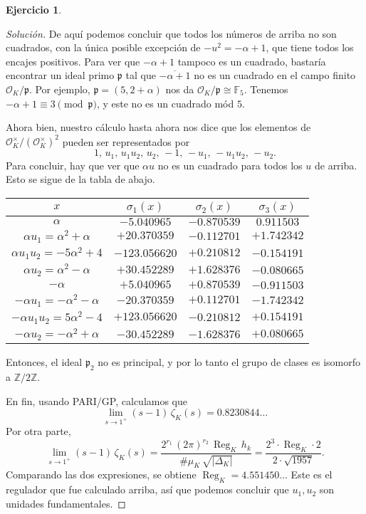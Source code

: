 \documentclass{article}
\theoremstyle{definition}
\newtheorem{ejercicio}{Ejercicio}
\newenvironment{solucion}{\begin{proof}[Solución]}{\end{proof}}
\DeclareMathOperator{\Reg}{Reg}
\newcommand{\FF}{\mathbb{F}}
\newcommand{\ZZ}{\mathbb{Z}}
\renewcommand{\O}{\mathcal{O}}
\begin{document}
\begin{ejercicio}
\begin{solucion}
    De aquí podemos concluir que todos los números de arriba no son cuadrados,
    con la única posible excepción de $-u^2 = -\alpha + 1$, que tiene todos los
    encajes positivos. Para ver que $-\alpha + 1$ tampoco es un cuadrado,
    bastaría encontrar un ideal primo $\mathfrak{p}$ tal que
    $\overline{-\alpha + 1}$ no es un cuadrado en el campo finito
    $\O_K/\mathfrak{p}$. Por ejemplo, $\mathfrak{p} = (5,2+\alpha)$ nos da
    $\O_K/\mathfrak{p} \cong \FF_5$.  Tenemos
    $-\alpha + 1 \equiv 3 \pmod{\mathfrak{p}}$, y este no es un cuadrado mód
    $5$.

    Ahora bien, nuestro cálculo hasta ahora nos dice que los elementos de
    $\O_K^\times/(\O_K^\times)^2$ pueden ser representados por
    $$1, \, u_1, \, u_1 u_2, \, u_2, \, -1, \, -u_1, \, -u_1 u_2, \, -u_2.$$
    Para concluir, hay que ver que $\alpha u$ no es un cuadrado para todos los
    $u$ de arriba. Esto se sigue de la tabla de abajo.

    \begin{center}
      \renewcommand{\arraystretch}{1.5}
      \begin{tabular}{cccc}
        \hline
        $x$ & $\sigma_1 (x)$ & $\sigma_2 (x)$ & $\sigma_3 (x)$ \\
        \hline
        $\alpha$ & $-5.040965$ & $-0.870539$ & $0.911503$ \\
        \hline
        $\alpha u_1 = \alpha^2 + \alpha$ & $+20.370359$ & $-0.112701$ & $+1.742342$ \\
        \hline
        $\alpha u_1 u_2 = -5\alpha^2 + 4$ & $-123.056620$ & $+0.210812$ & $-0.154191$ \\
        \hline
        $\alpha u_2 = \alpha^2 - \alpha$ & $+30.452289$ & $+1.628376$ & $-0.080665$ \\
        \hline
        $-\alpha$ & $+5.040965$ & $+0.870539$ & $-0.911503$ \\
        \hline
        $-\alpha u_1 = -\alpha^2 - \alpha$ & $-20.370359$ & $+0.112701$ & $-1.742342$ \\
        \hline
        $-\alpha u_1 u_2 = 5\alpha^2 - 4$ & $+123.056620$ & $-0.210812$ & $+0.154191$ \\
        \hline
        $-\alpha u_2 = -\alpha^2 + \alpha$ & $-30.452289$ & $-1.628376$ & $+0.080665$ \\
        \hline
      \end{tabular}
    \end{center}

    Entonces, el ideal $\mathfrak{p}_2$ no es principal, y por lo tanto el grupo
    de clases es isomorfo a $\ZZ/2\ZZ$.

    En fin, usando PARI/GP, calculamos que
    $$\lim_{s \to 1^+} (s-1)\,\zeta_K (s) = 0.8230844\ldots$$
    Por otra parte,
    $$\lim_{s \to 1^+} (s-1)\,\zeta_K (s) = \frac{2^{r_1}\,(2\pi)^{r_2}\,\Reg_K\,h_k}{\#\mu_K\,\sqrt{|\Delta_K|}} = \frac{2^3\cdot\Reg_K\cdot 2}{2\cdot \sqrt{1957}}.$$
    Comparando las dos expresiones, se obtiene $\Reg_K = 4.551450\ldots$ Este es
    el regulador que fue calculado arriba, así que podemos concluir que
    $u_1,u_2$ son unidades fundamentales.
  \end{solucion}
  \fi
\end{ejercicio}
\end{document}
